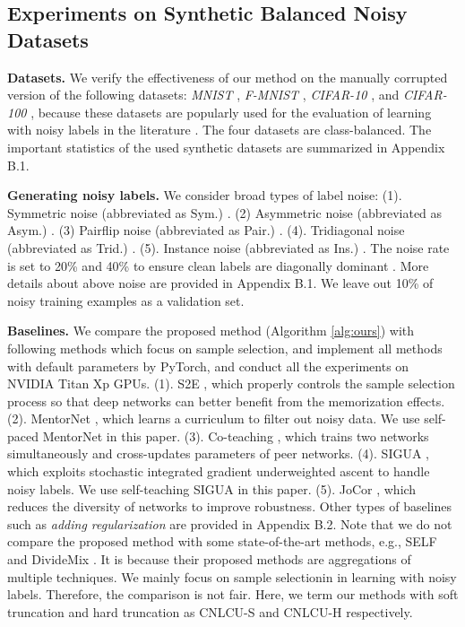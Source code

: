 \documentclass[11pt]{article}
\begin{document}
\subsection{Experiments on Synthetic Balanced Noisy Datasets}\label{sec:3.1}
\vspace{-5pt}
\textbf{Datasets.} We verify the effectiveness of our method on the manually corrupted version of the following datasets: \textit{MNIST} \citep{LeCunmnist}, \textit{F-MNIST} \citep{xiao2017fashion}, \textit{CIFAR-10} \citep{krizhevsky2009learning}, and \textit{CIFAR-100} \citep{krizhevsky2009learning}, because these datasets are popularly used for the evaluation of learning with noisy labels in the literature \citep{han2018co,yu2019does,wu2020class2simi,lee2019robust}. The four datasets are class-balanced. The important statistics of the used synthetic datasets are summarized in Appendix B.1.

\textbf{Generating noisy labels.}  We consider broad types of label noise: (1). Symmetric noise (abbreviated as Sym.) \citep{wu2020topological,ma2018dimensionality,li2021provably}. (2) Asymmetric noise (abbreviated as Asym.) \citep{ma2020normalized,xia2021robust,wei2020combating}. (3) Pairflip noise (abbreviated as Pair.) \citep{han2018co,yu2019does,zheng2020error}. (4). Tridiagonal noise (abbreviated as Trid.) \citep{zhang2021learning}. (5). Instance noise (abbreviated as Ins.) \citep{cheng2017learning,xia2020part}. The noise rate is set to 20\% and 40\% to ensure clean labels are diagonally dominant \citep{ma2020normalized}. More details about above noise are provided in Appendix B.1. We leave out 10\% of noisy training examples as a validation set.

\textbf{Baselines.} We compare the proposed method (Algorithm \ref{alg:ours}) with following methods which focus on sample selection, and implement all methods with default parameters by PyTorch, and conduct all the experiments on NVIDIA Titan Xp GPUs. (1). S2E \citep{yao2020searching}, which properly controls the sample selection process so that deep networks can better benefit from the memorization effects. (2). MentorNet \citep{jiang2018mentornet}, which learns a curriculum to filter out noisy data. We use self-paced MentorNet in this paper. (3). Co-teaching \citep{han2018co}, which trains two networks simultaneously and cross-updates parameters of peer networks. (4). SIGUA \citep{han2020sigua}, which exploits stochastic integrated gradient underweighted ascent to handle noisy labels. We use self-teaching SIGUA in this paper. (5). JoCor \citep{wei2020combating}, which reduces the diversity of networks to improve robustness. Other types of baselines such as \textit{adding regularization} are provided in Appendix B.2. Note that we do not compare the proposed method with some state-of-the-art methods, e.g., SELF \citep{nguyen2020self} and DivideMix \citep{li2020dividemix}. It is because their proposed methods are aggregations of multiple techniques. We mainly focus on sample selectionin in learning with noisy labels. Therefore, the comparison is not fair. Here, we term our methods with soft truncation and hard truncation as CNLCU-S and CNLCU-H respectively.
\end{document}

